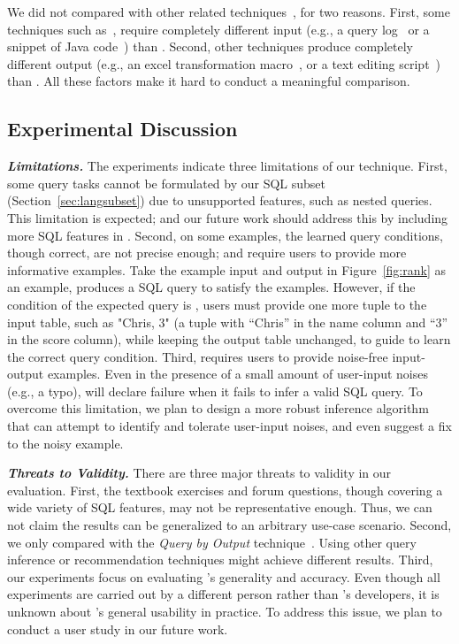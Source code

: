 We did not compared \ourtool with other related techniques~\cite{Howe:2011,
abs-1208-2013, Harris:2011, Kandel:2011}, for two reasons. First,
some techniques such as~\cite{Khoussainova:2010, Howe:2011, abs-1208-2013},
require completely different input (e.g., a query log~\cite{Khoussainova:2010, Howe:2011}
or a snippet of Java code~\cite{abs-1208-2013}) than \ourtool.
Second, other techniques produce completely different
output (e.g., an excel transformation macro~\cite{Harris:2011}, or a
text editing script~\cite{Kandel:2011}) than \ourtool. All these
factors make it hard to conduct a meaningful comparison.

\subsection{Experimental Discussion}

\noindent \textbf{\textit{Limitations.}}
The experiments indicate three limitations
of our technique. First, some query tasks
cannot be formulated by our SQL subset (Section~\ref{sec:langsubset})
due to unsupported features, such as
nested queries. This limitation is expected;
and our future work
should address this by including more SQL
features in \ourtool.
Second, on some examples, the learned query
conditions, though correct, are not precise
enough; and require users to provide more informative examples.
Take the example input and output in Figure~\ref{fig:rank}
as an example, \ourtool produces a SQL
query 
to satisfy the examples. However, if
the condition of the expected query
is , users must provide
one more tuple to the input table, such as "Chris, 3"
(a tuple with ``Chris'' in the name column and ``3''
in the score column), while keeping the output table
unchanged, 
to guide \ourtool to learn the correct query condition.
Third, \ourtool requires
users to provide noise-free input-output examples.
Even in the presence of a small amount of user-input
noises (e.g., a typo), \ourtool will declare failure
when it fails to infer a valid SQL query.
To overcome this limitation, we plan to design a more
robust inference algorithm that can attempt to identify
and tolerate user-input noises, and even suggest a fix
to the noisy example.

\vspace{1mm}
\noindent \textbf{\textit{Threats to Validity.}}
There are three major threats to validity
in our evaluation. First, the \exnum textbook exercises
and \pnum forum questions, though covering
a wide variety of SQL features, may not be representative enough.
Thus, we can not claim the results can be generalized to an
arbitrary use-case scenario. Second, we only compared
\ourtool with the \textit{Query by Output} technique~\cite{Tran:2009}.
Using other query inference or recommendation techniques
might achieve different results. Third, our
experiments focus on evaluating \ourtool's generality 
and accuracy. Even though all experiments are carried
out by a different person rather than \ourtool's developers,
it is unknown about \ourtool's general usability in practice.
To address this issue, we plan to conduct
a user study in our future work.


